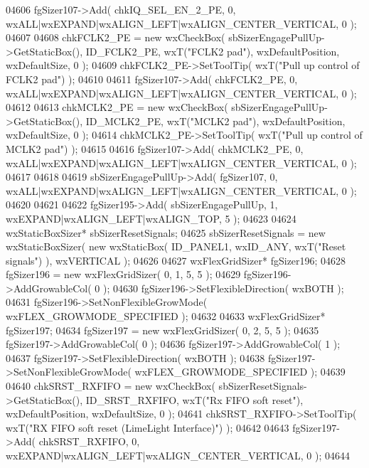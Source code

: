\begin{DoxyCode}
04606     fgSizer107->Add( chkIQ_SEL_EN_2_PE, 0, wxALL|wxEXPAND|wxALIGN\_LEFT|wxALIGN\_CENTER\_VERTICAL, 0 );
04607     
04608     chkFCLK2_PE = \textcolor{keyword}{new} wxCheckBox( sbSizerEngagePullUp->GetStaticBox(), 
      ID_FCLK2_PE, wxT(\textcolor{stringliteral}{"FCLK2 pad"}), wxDefaultPosition, wxDefaultSize, 0 );
04609     chkFCLK2_PE->SetToolTip( wxT(\textcolor{stringliteral}{"Pull up control of FCLK2 pad"}) );
04610     
04611     fgSizer107->Add( chkFCLK2_PE, 0, wxALL|wxEXPAND|wxALIGN\_LEFT|wxALIGN\_CENTER\_VERTICAL, 0 );
04612     
04613     chkMCLK2_PE = \textcolor{keyword}{new} wxCheckBox( sbSizerEngagePullUp->GetStaticBox(), 
      ID_MCLK2_PE, wxT(\textcolor{stringliteral}{"MCLK2 pad"}), wxDefaultPosition, wxDefaultSize, 0 );
04614     chkMCLK2_PE->SetToolTip( wxT(\textcolor{stringliteral}{"Pull up control of MCLK2 pad"}) );
04615     
04616     fgSizer107->Add( chkMCLK2_PE, 0, wxALL|wxEXPAND|wxALIGN\_LEFT|wxALIGN\_CENTER\_VERTICAL, 0 );
04617     
04618     
04619     sbSizerEngagePullUp->Add( fgSizer107, 0, wxALL|wxEXPAND|wxALIGN\_LEFT|wxALIGN\_CENTER\_VERTICAL, 0 );
04620     
04621     
04622     fgSizer195->Add( sbSizerEngagePullUp, 1, wxEXPAND|wxALIGN\_LEFT|wxALIGN\_TOP, 5 );
04623     
04624     wxStaticBoxSizer* sbSizerResetSignals;
04625     sbSizerResetSignals = \textcolor{keyword}{new} wxStaticBoxSizer( \textcolor{keyword}{new} wxStaticBox( ID_PANEL1, wxID\_ANY, wxT(\textcolor{stringliteral}{"Reset signals"}) 
      ), wxVERTICAL );
04626     
04627     wxFlexGridSizer* fgSizer196;
04628     fgSizer196 = \textcolor{keyword}{new} wxFlexGridSizer( 0, 1, 5, 5 );
04629     fgSizer196->AddGrowableCol( 0 );
04630     fgSizer196->SetFlexibleDirection( wxBOTH );
04631     fgSizer196->SetNonFlexibleGrowMode( wxFLEX\_GROWMODE\_SPECIFIED );
04632     
04633     wxFlexGridSizer* fgSizer197;
04634     fgSizer197 = \textcolor{keyword}{new} wxFlexGridSizer( 0, 2, 5, 5 );
04635     fgSizer197->AddGrowableCol( 0 );
04636     fgSizer197->AddGrowableCol( 1 );
04637     fgSizer197->SetFlexibleDirection( wxBOTH );
04638     fgSizer197->SetNonFlexibleGrowMode( wxFLEX\_GROWMODE\_SPECIFIED );
04639     
04640     chkSRST_RXFIFO = \textcolor{keyword}{new} wxCheckBox( sbSizerResetSignals->GetStaticBox(), 
      ID_SRST_RXFIFO, wxT(\textcolor{stringliteral}{"Rx FIFO soft reset"}), wxDefaultPosition, wxDefaultSize, 0 );
04641     chkSRST_RXFIFO->SetToolTip( wxT(\textcolor{stringliteral}{"RX FIFO soft reset (LimeLight Interface)"}) );
04642     
04643     fgSizer197->Add( chkSRST_RXFIFO, 0, wxEXPAND|wxALIGN\_LEFT|wxALIGN\_CENTER\_VERTICAL, 0 );
04644     

\end{DoxyCode}
